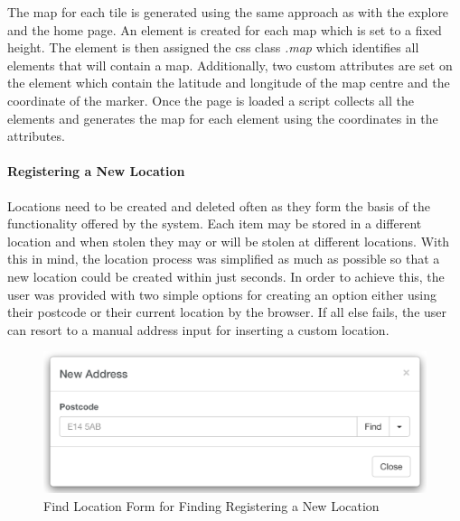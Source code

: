 The map for each tile is generated using the same approach as with the explore and the home page. An element is created for each map which is set to a fixed height. The element is then assigned the css class \emph{.map} which identifies all elements that will contain a map. Additionally, two custom attributes are set on the element which contain the latitude and longitude of the map centre and the coordinate of the marker. Once the page is loaded a script collects all the elements and generates the map for each element using the coordinates in the attributes.

\paragraph{Registering a New Location}
Locations need to be created and deleted often as they form the basis of the functionality offered by the system. Each item may be stored in a different location and when stolen they may or will be stolen at different locations. With this in mind, the location process was simplified as much as possible so that a new location could be created within just seconds. In order to achieve this, the user was provided with two simple options for creating an option either using their postcode or their current location by the browser. If all else fails, the user can resort to a manual address input for inserting a custom location.

\begin{figure}[H]
	\centering
	\includegraphics[width=1.0\textwidth]{images/Frisk/Dashboard_Find_Location}
	\caption{Find Location Form for Finding Registering a New Location} \label{fig:Dashboard_Find_Location}
\end{figure}

